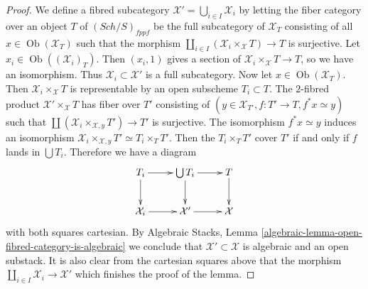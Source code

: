 \documentclass[10pt,a4paper]{amsart}
\theoremstyle{plain}
\theoremstyle{definition}
\theoremstyle{remark}
\numberwithin{equation}{subsection}
\def\Sch{\mathit{Sch}}
\def\Ob{\mathop{\mathrm{Ob}}\nolimits}
\begin{document}
\begin{proof}
We define a fibred subcategory
$\mathcal{X}' = \bigcup_{i \in I} \mathcal{X}_i$
by letting the fiber category over an object $T$ of $(\Sch/S)_{fppf}$
be the full subcategory of $\mathcal{X}_T$ consisting of all
$x \in \Ob(\mathcal{X}_T)$ such that the morphism
$\coprod_{i \in I} (\mathcal{X}_i \times_{\mathcal X} T) \to T$
is surjective. Let $x_i \in \Ob((\mathcal{X}_i)_T)$.
Then $(x_i, 1)$ gives a section of
$\mathcal{X}_i \times_{\mathcal X} T \to T$, so we have an isomorphism. Thus
$\mathcal{X}_i \subset \mathcal{X}'$ is a full subcategory.
Now let $x \in \Ob(\mathcal{X}_T)$. Then
$\mathcal{X}_i \times_{\mathcal X} T$ is representable
by an open subscheme $T_i \subset T$. The $2$-fibred product
$\mathcal{X}' \times_{\mathcal X} T$ has fiber over $T'$ consisting
of $(y \in \mathcal{X}_{T'}, f : T' \to T, f^*x \simeq y)$ such that
$\coprod (\mathcal{X}_i \times_{\mathcal X, y} T') \to T'$ is surjective.
The isomorphism $f^*x \simeq y$ induces an isomorphism
$\mathcal{X}_i \times_{\mathcal X, y} T' \simeq T_i \times_T T'$.
Then the $T_i \times_T T'$ cover $T'$ if and only if $f$ lands in
$\bigcup T_i$. Therefore we have a diagram
$$
\xymatrix{
T_i \ar[r] \ar[d] &
\bigcup T_i \ar[r] \ar[d] &
T \ar[d] \\
\mathcal{X}_i \ar[r] &
\mathcal{X}' \ar[r] &
\mathcal{X}
}
$$
with both squares cartesian. By
Algebraic Stacks, Lemma \ref{algebraic-lemma-open-fibred-category-is-algebraic}
we conclude that $\mathcal{X'} \subset \mathcal{X}$ is algebraic and an
open substack. It is also clear from the cartesian squares above that the
morphism $\coprod_{i \in I} \mathcal{X}_i \to \mathcal{X}'$ which
finishes the proof of the lemma.
\end{proof}
\end{document}
